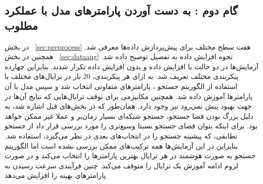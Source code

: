 \subsection{گام دوم : به دست آوردن پارامترهای مدل با عملکرد مطلوب  }
در بخش~
\ref{sec:preprocess}
هفت سطح مختلف برای پیش‌پردازش داده‌ها معرفی شد. همچنین در بخش~ 
\ref{sec:dataaug}
نحوه افزایش داده به تفصیل توضیح داده شد. آزمایش‌ها در دو حالت با افزایش داده و بدون افزایش داده تکرار شدند. بنابراین چهارده پیکربندی مختلف تعریف شد. به ازای هر پیکربندی، 20 بار در ترایال‌های مختلف با استفاده از الگوریتم جستجو
، پارامترهای متفاوتی انتخاب شد و سپس مدل با آن پارامترها آموزش داده شد. همچنین مکانیزمی برای توقف ترایال‌هایی که نتایج آن‌ها در جهت بهبود پیش نمی‌رود نیز وجود دارد. همان‌طور که در بخش‌های قبل اشاره شد، به دلیل بزرگ بودن فضا جستجو، جستجو شبکه‌ای بسیار زمان‌بر و عملا غیر ممکن خواهد بود. برای اینکه بتوان فضای جستجو نسبتا وسیع‌تری را مورد بررسی قرار داد از جستجو تطابقی، که پیشینه جستجو را در انتخاب‌های بعدی در نظر می‌گیرد، استفاده شد. بنابراین در این آزمایش‌ها همه ترکیب‌های ممکن بررسی نشده است اما الگوریتم جستجو به صورت هوشمند در هر ترایال بهترین پارامترها را انتخاب می‌کند و در صورت لزوم ادامه آموزش یک ترایال را متوقف می‌کند. چنین فرآیندی سرعت رسیدن به پارامترهای بهینه را افزایش می‌دهد.
